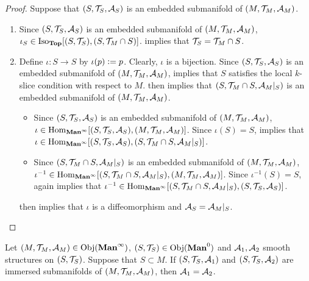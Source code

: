 \documentclass{book}
\begin{document}
	\begin{proof}
		Suppose that $(S, \mathcal{T}_S, \mathcal{A}_S)$ is an embedded submanifold of $(M, \mathcal{T}_M, \mathcal{A}_M)$. 
		\begin{enumerate}
			\item Since $(S, \mathcal{T}_S, \mathcal{A}_S)$ is an embedded submanifold of $(M, \mathcal{T}_M, \mathcal{A}_M)$, $\iota_S \in \operatorname{Iso}_{\operatorname*{\text{\textbf{Top}}}}[(S, \mathcal{T}_S), (S, \mathcal{T}_M \cap S)]$.  implies that $\mathcal{T}_S = \mathcal{T}_M \cap S$. 
			\item Define $\iota:S \rightarrow S$ by $\iota(p) \vcentcolon= p$. Clearly, $\iota$ is a bijection. Since $(S, \mathcal{T}_S, \mathcal{A}_S)$ is an embedded submanifold of $(M, \mathcal{T}_M, \mathcal{A}_M)$,  implies that $S$ satisfies the local $k$-slice condition with respect to $M$.  then implies that $(S, \mathcal{T}_M \cap S, \mathcal{A}_M|_S)$ is an embedded submanifold of $(M, \mathcal{T}_M, \mathcal{A}_M)$.
			\begin{itemize}
				\item Since $(S, \mathcal{T}_S, \mathcal{A}_S)$ is an embedded submanifold of $(M, \mathcal{T}_M, \mathcal{A}_M)$, $\iota \in \operatorname{Hom}_{\operatorname*{\text{\textbf{Man}}^{\infty}}}[(S, \mathcal{T}_S, \mathcal{A}_S), (M, \mathcal{T}_M, \mathcal{A}_M)]$. Since $\iota(S) = S$,  implies that $\iota \in \operatorname{Hom}_{\operatorname*{\text{\textbf{Man}}^{\infty}}}[(S, \mathcal{T}_S, \mathcal{A}_S), (S, \mathcal{T}_M \cap S, \mathcal{A}_M|_S)]$. 
				\item Since $(S, \mathcal{T}_M \cap S, \mathcal{A}_M|_S)$ is an embedded submanifold of $(M, \mathcal{T}_M, \mathcal{A}_M)$, $\iota^{-1} \in \operatorname{Hom}_{\operatorname*{\text{\textbf{Man}}^{\infty}}}[(S, \mathcal{T}_M \cap S, \mathcal{A}_M|_S), (M, \mathcal{T}_M, \mathcal{A}_M)]$. Since $\iota^{-1}(S) = S$,  again implies that $\iota^{-1} \in \operatorname{Hom}_{\operatorname*{\text{\textbf{Man}}^{\infty}}}[(S, \mathcal{T}_M \cap S, \mathcal{A}_M|_S), (S, \mathcal{T}_S, \mathcal{A}_S)]$. 
			\end{itemize}
			 then implies that $\iota$ is a diffeomorphism and $\mathcal{A}_S = \mathcal{A}_M|_S$. 
		\end{enumerate}
	\end{proof}

	\begin{ex}  
		Let $(M, \mathcal{T}_M, \mathcal{A}_M) \in \operatorname{Obj}(\operatorname*{\text{\textbf{Man}}^{\infty}})$, $(S, \MT_S) \in \Obj(\Man0)$ and $\mathcal{A}_1, \mathcal{A}_2$ smooth structures on $(S, \mathcal{T}_S)$. Suppose that $S \subset M$. If $(S, \mathcal{T}_S, \mathcal{A}_1)$ and $(S, \mathcal{T}_S, \mathcal{A}_2)$ are immersed submanifolds of $(M, \mathcal{T}_M, \mathcal{A}_M)$, then $\mathcal{A}_1 = \mathcal{A}_2$. 
	\end{ex}
	
\end{document}
